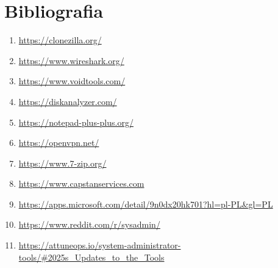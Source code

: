 \documentclass[0.82pt,a4paper]{article}
\begin{document}
\newpage
\section{Bibliografia}
\begin{enumerate}
	\item \url{https://clonezilla.org/}
    \item \url{https://www.wireshark.org/}
    \item \url{https://www.voidtools.com/}
    \item \url{https://diskanalyzer.com/}
    \item \url{https://notepad-plus-plus.org/}
    \item \url{https://openvpn.net/}
    \item \url{https://www.7-zip.org/}
    \item \href{https://www.capstanservices.com/tools-blog/2018/4/4/the-ultimate-silent-switch-finder-ussf}{https://www.capstanservices.com}
    \item \url{https://apps.microsoft.com/detail/9n0dx20hk701?hl=pl-PL&gl=PL}
    \item \url{https://www.reddit.com/r/sysadmin/ }
    \item \url{https://attuneops.io/system-administrator-tools/#2025s_Updates_to_the_Tools}
\end{enumerate}
\end{document}
